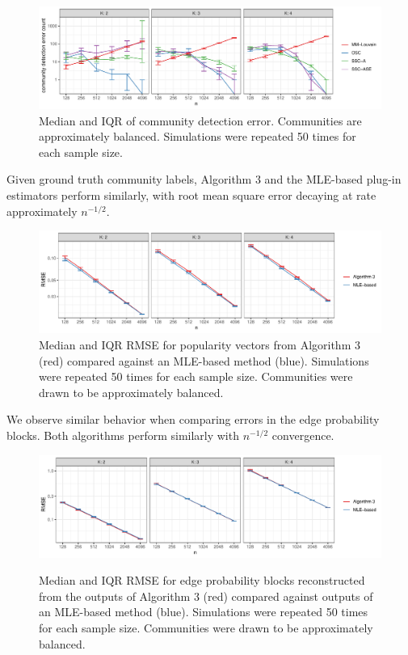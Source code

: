 \documentclass[12pt]{article}
\begin{document}
\begin{figure}[H]

{\centering \includegraphics{summary_files/figure-latex/clust_err_ct_sim-1}

}

\caption{Median and IQR of community detection error. Communities are approximately balanced. Simulations were repeated 50 times for each sample size.}\label{fig:clust_err_ct_sim}
\end{figure}

Given ground truth community labels, Algorithm 3 and the MLE-based
plug-in estimators \cite{307cbeb9b1be48299388437423d94bf1} 
perform similarly, with root mean square
error decaying at rate approximately \(n^{-1/2}\).

\begin{figure}[H]

{\centering \includegraphics{summary_files/figure-latex/lambda_est_k-1}

}

\caption{Median and IQR RMSE for popularity vectors from Algorithm 3 (red) compared against an MLE-based method (blue). Simulations were repeated 50 times for each sample size. Communities were drawn to be approximately balanced.}\label{fig:lambda_est_k}
\end{figure}

We observe similar behavior when comparing errors in the edge probability blocks. 
Both algorithms perform similarly with $n^{-1/2}$ convergence.

\begin{figure}[H]
{\centering \includegraphics{summary_files/figure-latex/lambda_est_p-1}}
\caption{Median and IQR RMSE for edge probability blocks reconstructed from the outputs of Algorithm 3 (red) compared against outputs of an MLE-based method (blue). Simulations were repeated 50 times for each sample size. Communities were drawn to be approximately balanced.}
\end{figure}
\end{document}
